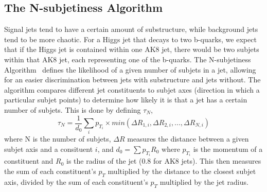 \vspace{5mm}
\subsection{The N-subjetiness Algorithm}

Signal jets tend to have a certain amount of substructure, while background jets tend to be more chaotic. For a Higgs jet that decays to two b-quarks, we expect that if the Higgs jet is contained within one AK8 jet, there would be two subjets within that AK8 jet, each representing one of the b-quarks.  The N-subjetiness Algorithm~\cite{Thaler:2010tr,Thaler:2011gf} defines the likelihood of a given number of subjets in a jet, allowing for an easier discrimination between jets with substructure and jets without. The algorithm compares different jet constituents to subjet axes (direction in which a particular subjet points) to determine how likely it is that a jet has a certain number of subjets. This is done by defining $\tau_N$, 
\begin{equation}
\tau_N = \frac{1}{d_0}\sum_i p_{T_i}\times min(\Delta R_{1,i},\Delta R_{2,i},...,\Delta R_{N,i})
\end{equation}
where N is the number of subjets, $\Delta R$ measures the distance between a given subjet axis and a consituent $i$, and $d_0 = \sum p_{T_i} R_0$ where $p_{T_i}$ is the momentum of a constituent and $R_0$ is the radius of the jet (0.8 for AK8 jets). This then measures the sum of each constituent's $p_{T}$ multiplied by the distance to the closest subjet axis, divided by the sum of each constituent's $p_{T}$ multiplied by the jet radius. 

